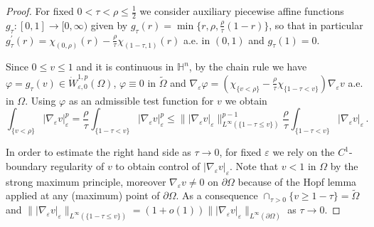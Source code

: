 \documentclass[10pt]{amsart}
\numberwithin{equation}{section}
\theoremstyle{definition}
\newcommand{\He}{\mathbb{H}}
\begin{document}
\begin{proof}
For fixed $0<\tau < \rho \leq \frac12$ we consider auxiliary piecewise affine functions $g_\tau:[0,1] \to [0,\infty)$ given by $g_\tau (r)= \min \{ r, \rho, \frac{\rho}{\tau} (1-r) \}$, so that in particular $g^\prime_\tau (r)=\chi_{(0,\rho)}(r)-\frac{\rho}{\tau} \chi_{(1-\tau,1)}(r)$ a.e. in $(0,1)$ and $g_\tau(1)=0$.

Since $0\leq v \leq 1$ and it is continuous in $\He^n$, by the chain rule we have $\varphi=g_\tau(v) \in \dot{W}^{1,p}_{\varepsilon,0}(\Omega)$, $\varphi \equiv 0$ in $\widetilde{\Omega}$ and $\nabla_\varepsilon \varphi=(\chi_{\{ v<\rho\}}-\frac{\rho}{\tau} \chi_{\{1-\tau <v\}} )\nabla_\varepsilon v $ a.e. in $\Omega$. Using $\varphi$ as an admissible test function for $v$ we obtain 
\[ \int_{\{ v <\rho\}}|\nabla_\varepsilon v|_\varepsilon^p= \frac{\rho}{\tau}  \int_{\{ 1-\tau <v\}}|\nabla_\varepsilon v|_\varepsilon^p \leq  \|  |\nabla_\varepsilon v|_\varepsilon \|_{L^\infty(\{1-\tau \leq v \})}^{p-1}    \frac{\rho}{\tau}  \int_{\{ 1-\tau <v\}}|\nabla_\varepsilon v|_\varepsilon \, . \]
 
In order to estimate the right hand side as $\tau \to 0$, for fixed $\varepsilon$ we rely on the $C^1$-boundary regularity of $v$ to obtain control of $|\nabla_\varepsilon v|_\varepsilon$. 
Note that $v<1$ in $\Omega$ by the strong maximum principle, moreover $\nabla_\varepsilon v \neq 0$ on $\partial \Omega$ because of the Hopf lemma applied at any (maximum) point of $\partial \Omega$. As a consequence $\cap_{\tau>0} \{ v \geq 1-\tau\}=\widetilde{\Omega}$ and $\| |\nabla_\varepsilon v|_\varepsilon \|_{L^\infty(\{1-\tau \leq v \})} =(1+o(1)) \| |\nabla_\varepsilon v|_\varepsilon \|_{L^\infty(\partial \Omega)}  $ as $\tau \to 0$. 


\end{proof}
\end{document}
